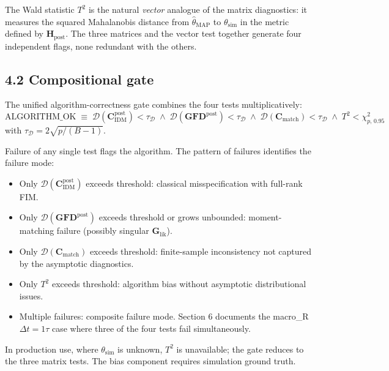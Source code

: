 \documentclass[11pt]{article}
\begin{document}
The Wald statistic $T^2$ is the natural \emph{vector} analogue of the
matrix diagnostics: it measures the squared Mahalanobis distance from
$\widehat\theta_{\mathrm{MAP}}$ to $\theta_{\mathrm{sim}}$ in the
metric defined by $\mathbf H_{\mathrm{post}}$. The three matrices and
the vector test together generate four independent flags, none
redundant with the others.

\subsection*{4.2 Compositional gate}

The unified algorithm-correctness gate combines the four tests
multiplicatively:
\begin{equation}
\mathrm{ALGORITHM\_OK}
\;\equiv\;
\mathcal D(\mathbf C_{\mathrm{IDM}}^{\mathrm{post}}) < \tau_{\mathcal D}
\;\wedge\;
\mathcal D(\mathbf{GFD}^{\mathrm{post}}) < \tau_{\mathcal D}
\;\wedge\;
\mathcal D(\mathbf C_{\mathrm{match}}) < \tau_{\mathcal D}
\;\wedge\;
T^2 < \chi^2_{p,\,0.95}
\label{eq:av-compositional-gate}
\end{equation}
with $\tau_{\mathcal D} = 2\sqrt{p/(B-1)}$.

Failure of any single test flags the algorithm. The pattern of failures
identifies the failure mode:
\begin{itemize}
\item Only $\mathcal D(\mathbf C_{\mathrm{IDM}}^{\mathrm{post}})$
  exceeds threshold: classical misspecification with full-rank FIM.
\item Only $\mathcal D(\mathbf{GFD}^{\mathrm{post}})$ exceeds threshold
  or grows unbounded: moment-matching failure (possibly singular
  $\mathbf G_{\mathrm{lik}}$).
\item Only $\mathcal D(\mathbf C_{\mathrm{match}})$ exceeds threshold:
  finite-sample inconsistency not captured by the asymptotic
  diagnostics.
\item Only $T^2$ exceeds threshold: algorithm bias without
  asymptotic distributional issues.
\item Multiple failures: composite failure mode. Section 6 documents
  the macro\_R $\Delta t = 1\tau$ case where three of the four tests
  fail simultaneously.
\end{itemize}

In production use, where $\theta_{\mathrm{sim}}$ is unknown, $T^2$ is
unavailable; the gate reduces to the three matrix tests. The bias
component requires simulation ground truth.
\end{document}
